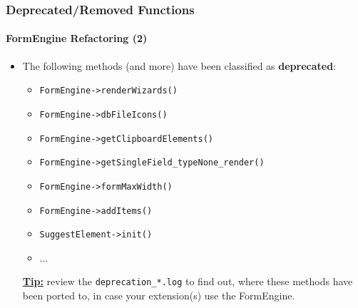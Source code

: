 
\begin{frame}[fragile]
	\frametitle{Deprecated/Removed Functions}
	\framesubtitle{FormEngine Refactoring (2)}

	\begin{itemize}

		\item The following methods (and more) have been classified as \textbf{deprecated}:

			\begin{itemize}
				\item \texttt{FormEngine->renderWizards()}
				\item \texttt{FormEngine->dbFileIcons()}
				\item \texttt{FormEngine->getClipboardElements()}
				\item \texttt{FormEngine->getSingleField\_typeNone\_render()}
				\item \texttt{FormEngine->formMaxWidth()}
				\item \texttt{FormEngine->addItems()}
				\item \texttt{SuggestElement->init()}
				\item ...
			\end{itemize}

		\small
			\underline{\textbf{Tip:}}
			review the \texttt{deprecation\_*.log} to find out, where these methods
			have been ported to, in case your extension(s) use the FormEngine.
		\normalsize

	\end{itemize}

\end{frame}


